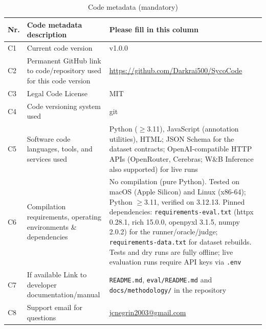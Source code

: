 \documentclass[preprint,12pt, a4paper]{elsarticle}
\begin{document}
\begin{table}[!h]
\begin{tabular}{|l|p{5.8cm}|p{5.8cm}|}
\hline
\textbf{Nr.} & \textbf{Code metadata description} & \textbf{Please fill in this column} \\
\hline
C1 & Current code version & v1.0.0 \\ %
\hline
C2 & Permanent GitHub link to code/repository used for this code version & \url{https://github.com/Darkrai500/SycoCode} \\ %
\hline
C3 & Legal Code License   & MIT \\ %
\hline
C4 & Code versioning system used & git \\
\hline
C5 & Software code languages, tools, and services used & Python ($\geq$3.11), JavaScript (annotation utilities), HTML; JSON Schema for the dataset contracts; OpenAI-compatible HTTP APIs (OpenRouter, Cerebras; W\&B Inference also supported) for live runs \\ %
\hline
C6 & Compilation requirements, operating environments \& dependencies & No compilation (pure Python). Tested on macOS (Apple Silicon) and Linux (x86-64); Python $\geq$3.11, verified on 3.12.13. Pinned dependencies: \texttt{requirements-eval.txt} (httpx 0.28.1, rich 15.0.0, openpyxl 3.1.5, numpy 2.0.2) for the runner/oracle/judge; \texttt{requirements-data.txt} for dataset rebuilds. Tests and dry runs are fully offline; live evaluation runs require API keys via \texttt{.env} \\ %
\hline
C7 & If available Link to developer documentation/manual & \texttt{README.md}, \texttt{eval/README.md} and \texttt{docs/methodology/} in the repository \\
\hline
C8 & Support email for questions & \href{mailto:jcnegrin2003@gmail.com}{jcnegrin2003@gmail.com} \\
\hline
\end{tabular}
\caption{Code metadata (mandatory)}
\label{tab:codemetadata}
\end{table}
\end{document}
